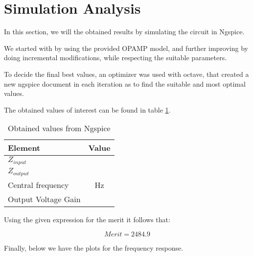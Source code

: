 \newpage

\section{Simulation Analysis}
\label{sec:simulation}

In this section, we will the obtained results by simulating the circuit in Ngspice.
 
We started with by using the provided OPAMP model, and further improving by doing incremental modifications, while respecting the suitable parameters.

To decide the final best values, an optimizer was used with octave, that created a new ngspice document in each iteration as to find the suitable and most optimal values. %

The obtained values of interest can be found in table \ref{tab:sim1}.

\begin{table}[h]
    \centering
    \begin{tabular}{|l|c|}
    \hline
    {\bf Element} & {\bf Value} \\
    \hline \hline
    $Z_{input}$ & \\
    \hline
    $Z_{output}$ & \\
    \hline
    Central frequency &  Hz \\
    \hline
    Output Voltage Gain & \\
    \hline
    \end{tabular}
    \caption{Obtained values from Ngspice}
    \label{tab:sim1}
\end{table}


Using the given expression for the merit it follows that:

\begin{equation}
    Merit = 2484.9
    \label{eq:merit}
\end{equation}

Finally, below we have the plots for the frequency response.



